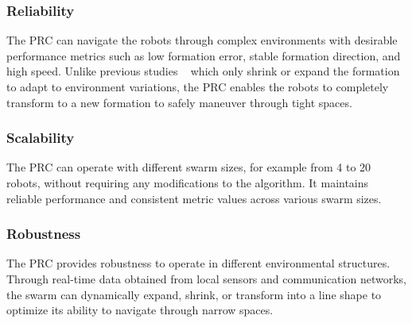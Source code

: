 \subsubsection{Reliability}

The PRC can navigate the robots through complex environments with desirable performance metrics such as low formation error, stable formation direction, and high speed. Unlike previous studies ~\cite{Elkilany2020,Vsrhelyi2018,Soria2021,AlonsoMora2018} which only shrink or expand the formation to adapt to environment variations, the PRC enables the robots to completely transform to a new formation to safely maneuver through tight spaces.

\subsubsection{Scalability}
The PRC can operate with different swarm sizes, for example from 4 to 20 robots, without requiring any modifications to the algorithm. It maintains reliable performance and consistent metric values across various swarm sizes. 

\subsubsection{Robustness}
The PRC provides robustness to operate in different environmental structures. Through real-time data obtained from local sensors and communication networks, the swarm can dynamically expand, shrink, or transform into a line shape to optimize its ability to navigate through narrow spaces.